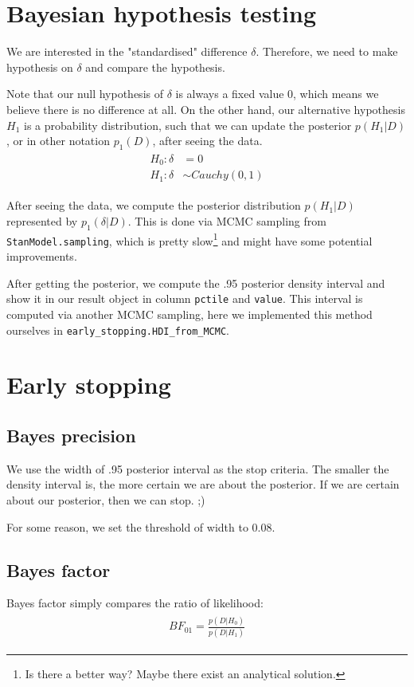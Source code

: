 \documentclass[paper=a4, fontsize=11pt]{scrartcl} %
\numberwithin{equation}{section} %
\numberwithin{figure}{section} %
\numberwithin{table}{section} %
\begin{document}
\section{Bayesian hypothesis testing}
\label{sec:byt}
We are interested in the "standardised" difference $\delta$. Therefore, we need to make hypothesis on $\delta$ and compare the hypothesis. 

Note that our null hypothesis of $\delta$ is always a fixed value $0$, which means we believe there is no difference at all. On the other hand, our alternative hypothesis $H_1$ is a probability distribution, such that we can update the posterior $p(H_1 |D)$, or in other notation $p_1(D)$, after seeing the data.
\begin{align}
\begin{split}
H_0:  \delta &= 0 \\
H_1:  \delta &\sim \mathit{Cauchy} (0, 1)
\end{split}	
\end{align}

After seeing the data, we compute the posterior distribution $p(H_1 |D)$ represented by $p_1( \delta | D)$. This is done via MCMC sampling from \texttt{StanModel.sampling}, which is pretty slow\footnote{Is there a better way? Maybe there exist an analytical solution.} and might have some potential improvements.

After getting the posterior, we compute the .95 posterior density interval and show it in our result object in column \texttt{pctile} and \texttt{value}. This interval is computed via another MCMC sampling, here we implemented this method ourselves in \texttt{early\_stopping.HDI\_from\_MCMC}.



\section{Early stopping}

\subsection{Bayes precision}
We use the width of .95 posterior interval as the stop criteria. The smaller the density interval is, the more certain we are about the posterior.
If we are certain about our posterior, then we can stop. ;)

For some reason, we set the threshold of width to 0.08.

\subsection{Bayes factor}
Bayes factor simply compares the ratio of likelihood:
\begin{align}
\begin{split}
BF_{01} = \frac{p(D|H_0)}{p(D|H_1)}
\end{split}
\end{align}
\end{document}
